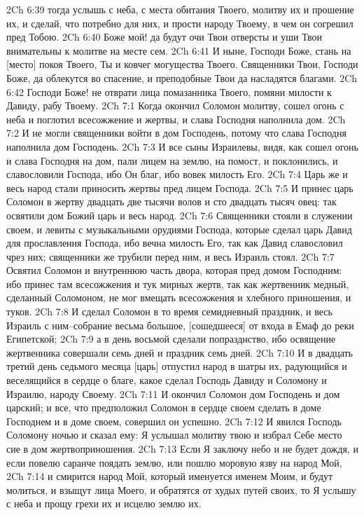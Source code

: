 2Ch 6:39  тогда услышь с неба, с места обитания Твоего, молитву их и прошение их, и сделай, что потребно для них, и прости народу Твоему, в чем он согрешил пред Тобою.
2Ch 6:40  Боже мой! да будут очи Твои отверсты и уши Твои внимательны к молитве на месте сем.
2Ch 6:41  И ныне, Господи Боже, стань на [место] покоя Твоего, Ты и ковчег могущества Твоего. Священники Твои, Господи Боже, да облекутся во спасение, и преподобные Твои да насладятся благами.
2Ch 6:42  Господи Боже! не отврати лица помазанника Твоего, помяни милости к Давиду, рабу Твоему.
2Ch 7:1  Когда окончил Соломон молитву, сошел огонь с неба и поглотил всесожжение и жертвы, и слава Господня наполнила дом.
2Ch 7:2  И не могли священники войти в дом Господень, потому что слава Господня наполнила дом Господень.
2Ch 7:3  И все сыны Израилевы, видя, как сошел огонь и слава Господня на дом, пали лицем на землю, на помост, и поклонились, и славословили Господа, ибо Он благ, ибо вовек милость Его.
2Ch 7:4  Царь же и весь народ стали приносить жертвы пред лицем Господа.
2Ch 7:5  И принес царь Соломон в жертву двадцать две тысячи волов и сто двадцать тысяч овец: так освятили дом Божий царь и весь народ.
2Ch 7:6  Священники стояли в служении своем, и левиты с музыкальными орудиями Господа, которые сделал царь Давид для прославления Господа, ибо вечна милость Его, так как Давид славословил чрез них; священники же трубили перед ним, и весь Израиль стоял.
2Ch 7:7  Освятил Соломон и внутреннюю часть двора, которая пред домом Господним: ибо принес там всесожжения и тук мирных жертв, так как жертвенник медный, сделанный Соломоном, не мог вмещать всесожжения и хлебного приношения, и туков.
2Ch 7:8  И сделал Соломон в то время семидневный праздник, и весь Израиль с ним--собрание весьма большое, [сошедшееся] от входа в Емаф до реки Египетской;
2Ch 7:9  а в день восьмой сделали попразднство, ибо освящение жертвенника совершали семь дней и праздник семь дней.
2Ch 7:10  И в двадцать третий день седьмого месяца [царь] отпустил народ в шатры их, радующийся и веселящийся в сердце о благе, какое сделал Господь Давиду и Соломону и Израилю, народу Своему.
2Ch 7:11  И окончил Соломон дом Господень и дом царский; и все, что предположил Соломон в сердце своем сделать в доме Господнем и в доме своем, совершил он успешно.
2Ch 7:12  И явился Господь Соломону ночью и сказал ему: Я услышал молитву твою и избрал Себе место сие в дом жертвоприношения.
2Ch 7:13  Если Я заключу небо и не будет дождя, и если повелю саранче поядать землю, или пошлю моровую язву на народ Мой,
2Ch 7:14  и смирится народ Мой, который именуется именем Моим, и будут молиться, и взыщут лица Моего, и обратятся от худых путей своих, то Я услышу с неба и прощу грехи их и исцелю землю их.
